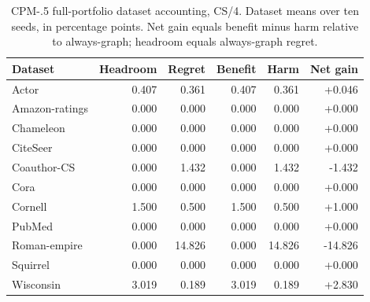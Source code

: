 \begin{table}[tbp]
\centering
\caption{CPM-.5 full-portfolio dataset accounting, CS/4. Dataset means over ten seeds, in percentage points. Net gain equals benefit minus harm relative to always-graph; headroom equals always-graph regret.}
\label{tab:cpm_account_CS_4}
\small
\setlength{\tabcolsep}{3pt}
\begin{tabular}{@{}lrrrrr@{}}
\toprule
Dataset & Headroom & Regret & Benefit & Harm & Net gain \\
\midrule
Actor & 0.407 & 0.361 & 0.407 & 0.361 & +0.046 \\
Amazon-ratings & 0.000 & 0.000 & 0.000 & 0.000 & +0.000 \\
Chameleon & 0.000 & 0.000 & 0.000 & 0.000 & +0.000 \\
CiteSeer & 0.000 & 0.000 & 0.000 & 0.000 & +0.000 \\
Coauthor-CS & 0.000 & 1.432 & 0.000 & 1.432 & -1.432 \\
Cora & 0.000 & 0.000 & 0.000 & 0.000 & +0.000 \\
Cornell & 1.500 & 0.500 & 1.500 & 0.500 & +1.000 \\
PubMed & 0.000 & 0.000 & 0.000 & 0.000 & +0.000 \\
Roman-empire & 0.000 & 14.826 & 0.000 & 14.826 & -14.826 \\
Squirrel & 0.000 & 0.000 & 0.000 & 0.000 & +0.000 \\
Wisconsin & 3.019 & 0.189 & 3.019 & 0.189 & +2.830 \\
\bottomrule
\end{tabular}
\end{table}

